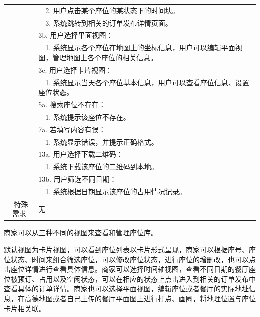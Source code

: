 \begin{table}[htbp!]
\begin{tabular}{cp{11.5cm}}
    & ~~2.	用户点击某个座位的某状态下的时间块。\\
    & ~~3.	系统跳转到相关的订单发布详情页面。\\
    & 3b. 用户选择平面视图：\\
    & ~~1.	系统显示各个座位在地图上的坐标信息，用户可以编辑平面视图，管理地图上各个座位的相关信息。\\
    & 3c. 用户选择卡片视图：\\
    & ~~1.	系统显示当天各个座位基本信息，用户可以查看座位信息、设置座位状态。\\
    & 5a. 搜索座位不存在：\\
    & ~~1.	系统提示该座位不存在。\\
    & 7a. 若填写内容有误：\\
    & ~~1.	系统显示错误，并提示正确格式。\\
    & 13a. 用户选择下载二维码：\\
    & ~~1.	系统下载该座位的二维码到本地。\\
    & 13b. 用户筛选不同日期：\\
    & ~~1.	系统根据日期显示该座位的占用情况记录。\\
  \hline
  \ 特殊需求 & 无 \\ 
  \hline
  \end{tabular}
  \label{table:uc7}
\end{table}

商家可以从三种不同的视图来查看和管理座位库。

默认视图为卡片视图，可以看到座位列表以卡片形式呈现，商家可以根据座号、座位状态、时间来组合筛选座位，可以修改座位状态，进行座位的增删改，也可以点击座位详情进行查看具体信息。商家可以选择时间轴视图，查看不同日期的餐厅座位被预订、占用以及空闲状态，可以在相应的状态上点击进入到相关的订单发布中查看具体的订单详情。商家也可以选择平面视图，编辑座位或者餐厅的实际地址信息，在高德地图或者自己上传的餐厅平面图上进行打点、画圈，将地理位置与座位卡片相关联。

